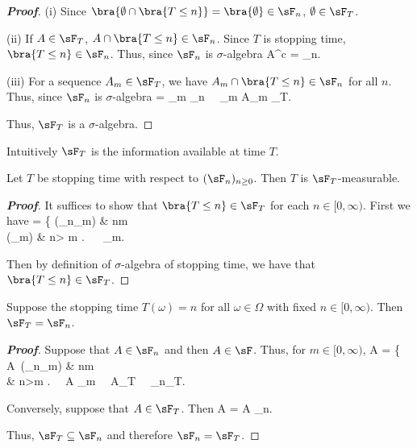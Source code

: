 \begin{proof}[\bf Proof]
\ben
\item [(i)] Since $\bra{\emptyset \cap \bra{T\leq n}} = \bra{\emptyset} \in \sF_n$, $\emptyset \in \sF_T$.
\item [(ii)] If $A\in \sF_T$, $A \cap \bra{T\leq n} \in \sF_n$. Since $T$ is stopping time, $\bra{T\leq n}\in \sF_n$. Thus, since $\sF_n$ is $\sigma$-algebra
\be
A^c \cap {} =  \bs {} \in \sF_n.
\ee
\item [(iii)] For a sequence $A_m \in \sF_T$, we have $A_m \cap \bra{T\leq n}\in \sF_n$ for all $n$. Thus, since $\sF_n$ is $\sigma$-algebra
\be
{} \cap {} = \bigcup_m  \in \sF_n  \ \ra \ \bigcup_m A_m \in \sF_T.
\ee
\een

Thus, $\sF_T$ is a $\sigma$-algebra.
\end{proof}

\begin{remark}
Intuitively $\sF_T$ is the information available at time $T$.%
\end{remark}


\begin{proposition}
Let $T$ be stopping time with respect to $(\sF_n)_{n\geq 0}$. Then $T$ is $\sF_T$-measurable.
\end{proposition}

\begin{proof}[\bf Proof]
It suffices to show that $\bra{T\leq n}\in \sF_T$ for each $n\in [0,\infty)$. First we have
\be
{}\cap {} = \left\{
 (\in \sF_n\subseteq \sF_m) \quad\quad & n\leq m \\
(\in \sF_m) & n> m
\ea
\right. \ \ra\ \cap {} \in \sF_m.
\ee

Then by definition of $\sigma$-algebra of stopping time, we have that $\bra{T\leq n}\in \sF_T$.
\end{proof}


\begin{proposition}
Suppose the stopping time $T(\omega)=n$ for all $\omega \in \Omega$ with fixed $n\in [0,\infty)$. Then $\sF_T = \sF_n$.
\end{proposition}

\begin{proof}[\bf Proof]
Suppose that $A\in \sF_n$ and then $A\in \sF$. Thus, for $m\in [0,\infty)$,
\be
A\cap {} = \left\{
A\ (\in \sF_n\subseteq \sF_m) \quad\quad & n\leq m \\
\emptyset & n>m
\ea\right. \ \ra\ A\cap {} \in \sF_m \ \ra\ A\in \sF_T \ \ra\ \sF_n\subseteq \sF_T.
\ee

Conversely, suppose that $A\in \sF_T$. Then
\be
A = A \cap {} \in \sF_n.
\ee

Thus, $\sF_T\subseteq \sF_n$ and therefore $\sF_n= \sF_T$.
\end{proof}




